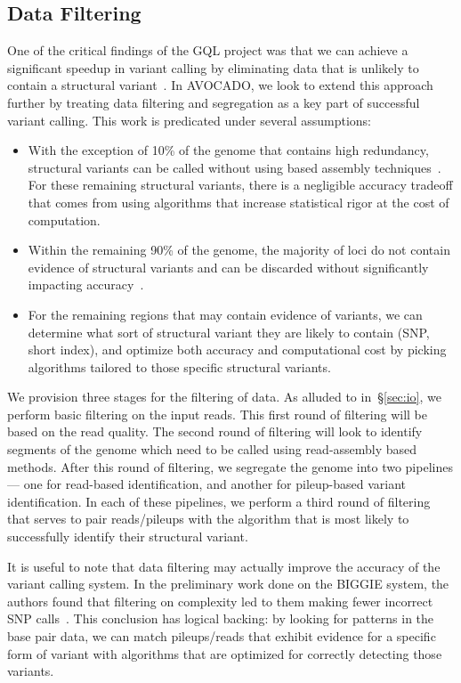 \documentclass[11pt]{article}
\begin{document}
\subsection{Data Filtering}
\label{sec:data-filtering}

One of the critical findings of the GQL project was that we can achieve a significant speedup in variant calling by eliminating
data that is unlikely to contain a structural variant~\cite{kozanitis13}. In AVOCADO, we look to extend this approach further by treating
data filtering and segregation as a key part of successful variant calling. This work is predicated under several assumptions:

\begin{itemize}
\item With the exception of 10\% of the genome that contains high redundancy, structural variants can be called without
using based assembly techniques~\cite{xia09}. For these remaining structural variants, there is a negligible accuracy
tradeoff that comes from using algorithms that increase statistical rigor at the cost of computation.
\item Within the remaining 90\% of the genome, the majority of loci do not contain evidence of structural variants and
can be discarded without significantly impacting accuracy~\cite{kozanitis13}.
\item For the remaining regions that may contain evidence of variants, we can determine what sort of structural variant they
are likely to contain (SNP, short index), and optimize both accuracy and computational cost by picking algorithms tailored
to those specific structural variants.
\end{itemize}

We provision three stages for the filtering of data. As alluded to in~\S\ref{sec:io}, we perform basic filtering on the input reads.
This first round of filtering will be based on the read quality. The second round of filtering will look to identify segments of the
genome which need to be called using read-assembly based methods. After this round of filtering, we segregate the genome
into two pipelines --- one for read-based identification, and another for pileup-based variant identification. In each of these
pipelines, we perform a third round of filtering that serves to pair reads/pileups with the algorithm that is most likely to successfully
identify their structural variant.

It is useful to note that data filtering may actually improve the accuracy of the variant calling system. In the preliminary work
done on the BIGGIE system, the authors found that filtering on complexity led to them making fewer incorrect SNP
calls~\cite{xia12}. This conclusion has logical backing: by looking for patterns in the base pair data, we can match
pileups/reads that exhibit evidence for a specific form of variant with algorithms that are optimized for correctly detecting
those variants.
\end{document}
